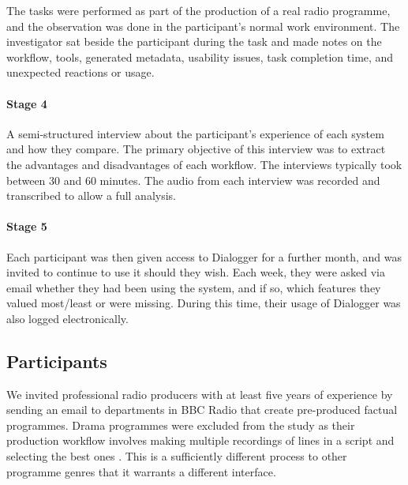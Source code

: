    The tasks were performed as part of the production of a real radio programme, and the observation was done in the
    participant's normal work environment.  The investigator sat beside the participant during the task and made notes
    on the workflow, tools, generated metadata, usability issues, task completion time, and unexpected reactions or
    usage.

\paragraph{Stage 4}
    A semi-structured interview about the participant's experience of each system and how they compare. The primary
    objective of this interview was to extract the advantages and disadvantages of each workflow. The interviews
    typically took between 30 and 60 minutes. The audio from each interview was recorded and transcribed to allow a
    full analysis.


\paragraph{Stage 5}
    Each participant was then given access to Dialogger for a further month, and was invited to continue to use it
    should they wish. Each week, they were asked via email whether they had been using the system, and if so, which
    features they valued most/least or were missing.  During this time, their usage of Dialogger was also logged
    electronically.

\subsection{Participants}
We invited professional radio producers with at least five years of experience by sending an email to departments in
BBC Radio that create pre-produced factual programmes.  Drama programmes were excluded from the study as their
production workflow involves making multiple recordings of lines in a script and selecting the best ones
\citep{Baume2015}. This is a sufficiently different process to other programme genres that it warrants a different
interface.

